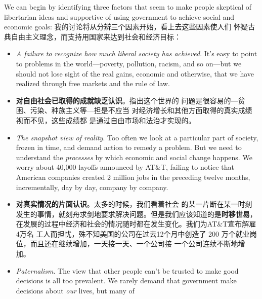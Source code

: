 \begin{paracol}{2}
\switchcolumn*
We can begin by identifying three factors that seem to make
people skeptical of libertarian ideas and supportive of using
government to achieve social and economic goals:
\switchcolumn
我的讨论将从分辨三个因素开始，看上去这些因素使人们
怀疑古典自由主义理念，而支持用国家来达到社会和经济目标：
\switchcolumn*
\begin{itemize}
	\item \textit{A failure to recognize how much liberal society has achieved}. It's
	easy to point to problems in the world---poverty, pollution,
	racism, and so on---but we should not lose sight of the real
	gains, economic and otherwise, that we have realized
	through free markets and the rule of law.
\end{itemize}
\switchcolumn
\begin{itemize}
	\item \textbf{对自由社会已取得的成就缺乏认识}。指出这个世界的
	问题是很容易的---贫困、污染、种族主义等---担是不应当
	对经济增长和其他方面取得的真实成绩视而不见，这些成绩都
	是通过自由市场和法治才实现的。
\end{itemize}
\switchcolumn*
\begin{itemize}
	\item \textit{The snapshot view of reality}. Too often we look at a particular
	part of society, frozen in time, and demand action to remedy
	a problem. But we need to understand the \textit{processes} by which
	economic and social change happens. We worry about
	40,000 layoffs announced by AT\&T, failing to notice that
	American companies created 2 million jobs in the preceding
	twelve months, incrementally, day by day, company by company.
\end{itemize}
\switchcolumn
\begin{itemize}
	\item \textbf{对真实情况的片面认识}。太多的时候，我们看着社会
	的某一片断在某一时刻发生的事情，就刻舟求剑地要求解决问题。但是我们应该知道的是\textbf{时移世易}，在发展的过程中经济和社会的情况随时都在发生变化。我们为AT\&T宣布解雇4万名
	工人而担忧，殊不知美国的公司在过去12个月中创造了 200
	万个就业岗位，而且还在继续增加，一天接一天、一个公司接
	一个公司连续不断地增加。
\end{itemize}
\switchcolumn*
\begin{itemize}
	\item \textit{Paternalism}. The view that other people can't be trusted to
	make good decisions is all too prevalent. We rarely demand
	that government make decisions about \textit{our} lives, but many of

\end{itemize}
\end{paracol}
